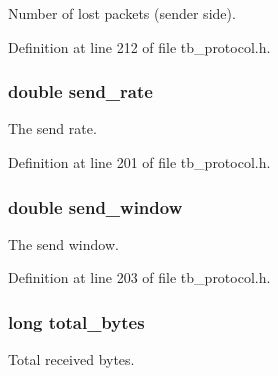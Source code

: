 Number of lost packets (sender side). 



Definition at line 212 of file tb\-\_\-protocol.\-h.

\hypertarget{structtb__prot__stats__t_a67477aa01a9beb18e9738c11e847a9fc}{
\subsubsection[{send\-\_\-rate}]{\setlength{\rightskip}{0pt plus 5cm}double send\-\_\-rate}}\label{structtb__prot__stats__t_a67477aa01a9beb18e9738c11e847a9fc}


The send rate. 



Definition at line 201 of file tb\-\_\-protocol.\-h.

\hypertarget{structtb__prot__stats__t_ab0aed934e7f36cd46104bd3dd5b14c1d}{
\subsubsection[{send\-\_\-window}]{\setlength{\rightskip}{0pt plus 5cm}double send\-\_\-window}}\label{structtb__prot__stats__t_ab0aed934e7f36cd46104bd3dd5b14c1d}


The send window. 



Definition at line 203 of file tb\-\_\-protocol.\-h.

\hypertarget{structtb__prot__stats__t_af793b9ec786f2ae3a01e61bd38994e72}{
\subsubsection[{total\-\_\-bytes}]{\setlength{\rightskip}{0pt plus 5cm}long total\-\_\-bytes}}\label{structtb__prot__stats__t_af793b9ec786f2ae3a01e61bd38994e72}


Total received bytes. 



